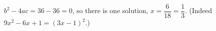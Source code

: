 $b^2-4ac=36-36=0$, so there is one solution, $x=\dfrac{6}{18}=\boxed{\dfrac13}$. (Indeed $9x^2-6x+1=(3x-1)^2$.)
